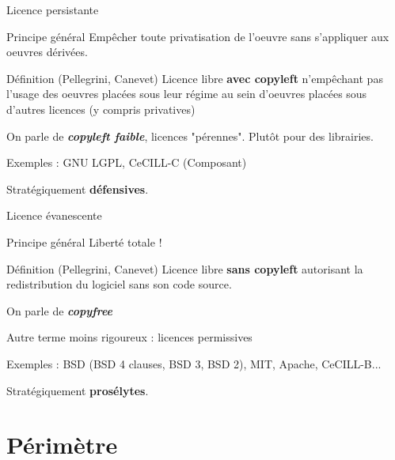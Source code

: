 \documentclass{beamer}
\begin{document}
\begin{frame}{Licence persistante}

\begin{block}{Principe général}
    Empêcher toute privatisation de l'oeuvre sans s'appliquer aux oeuvres dérivées.
  \end{block}

  \begin{alertblock}{Définition (Pellegrini, Canevet)}
    Licence libre \textbf{avec copyleft} n'empêchant pas l'usage des oeuvres placées sous leur régime au sein d'oeuvres placées sous d'autres licences (y compris privatives)
   \end{alertblock}

On parle de \textit{\textbf{copyleft faible}}, licences "pérennes". Plutôt pour des librairies.
 
Exemples : GNU LGPL, CeCILL-C (Composant)

Stratégiquement \textbf{défensives}.

\end{frame}


\begin{frame}{Licence évanescente}

  \begin{block}{Principe général}
    Liberté totale !
  \end{block}

  \begin{alertblock}{Définition (Pellegrini, Canevet)}
    Licence libre \textbf{sans copyleft} autorisant la redistribution du logiciel sans son code source.
   \end{alertblock}

On parle de \textit{\textbf{copyfree}}

Autre terme moins rigoureux : licences permissives 

Exemples : BSD (BSD 4 clauses, BSD 3, BSD 2), MIT, Apache, CeCILL-B... 

Stratégiquement \textbf{prosélytes}.

\end{frame}

\section{Périmètre}
\end{document}
